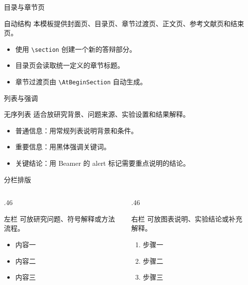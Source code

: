 \documentclass[12pt,aspectratio=43]{beamer}
\newcommand{\JLUEmph}[1]{{\JLUHei #1}}
\begin{document}
\begin{frame}{目录与章节页}
  \begin{block}{自动结构}
    本模板提供封面页、目录页、章节过渡页、正文页、参考文献页和结束页。
  \end{block}

  \begin{itemize}
    \item 使用 \texttt{\textbackslash section} 创建一个新的答辩部分。
    \item 目录页会读取统一定义的章节标题。
    \item 章节过渡页由 \texttt{\textbackslash AtBeginSection} 自动生成。
  \end{itemize}
\end{frame}

\begin{frame}{列表与强调}
  \begin{block}{无序列表}
    适合放研究背景、问题来源、实验设置和结果解释。
  \end{block}

  \begin{itemize}
    \item 普通信息：用常规列表说明背景和条件。
    \item \JLUEmph{重要信息}：用黑体强调关键词。
    \item \alert{关键结论}：用 Beamer 的 alert 标记需要重点说明的结论。
  \end{itemize}
\end{frame}

\begin{frame}{分栏排版}
  \begin{columns}[T,totalwidth=\textwidth]
    \begin{column}{.46\textwidth}
      \begin{block}{左栏}
        可放研究问题、符号解释或方法流程。
      \end{block}

      \begin{itemize}
        \item 内容一
        \item 内容二
        \item 内容三
      \end{itemize}
    \end{column}
    \begin{column}{.46\textwidth}
      \begin{block}{右栏}
        可放图表说明、实验结论或补充解释。
      \end{block}

      \begin{enumerate}
        \item 步骤一
        \item 步骤二
        \item 步骤三
      \end{enumerate}
    \end{column}
  \end{columns}
\end{frame}
\end{document}
